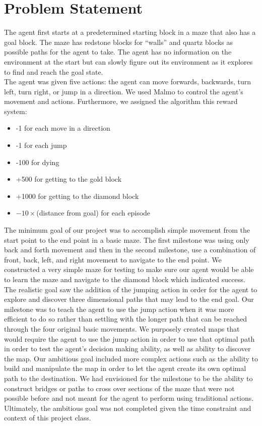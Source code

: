 \documentclass{article}
\begin{document}
\section{Problem Statement}

The agent first starts at a predetermined starting block in a maze that also has a goal block. The maze has redstone blocks for “walls” and quartz blocks as possible paths for the agent to take. The agent has no information on the environment at the start but can slowly figure out its environment as it explores to find and reach the goal state. \\
The agent was given five actions: the agent can move forwards, backwards, turn left, turn right, or jump in a direction. We used Malmo to control the agent’s movement and actions. Furthermore, we assigned the algorithm this reward system:

\begin{itemize}
    \item -1 for each move in a direction
    \item -1 for each jump
    \item -100 for dying
    \item +500 for getting to the gold block
    \item +1000 for getting to the diamond block
    \item $-10  \times $(distance from goal) for each episode
\end{itemize}
The minimum goal of our project was to accomplish simple movement from the start point to the end point in a basic maze. The first milestone was using only back and forth movement and then in the second milestone, use a combination of front, back, left, and right movement to navigate to the end point. We constructed a very simple maze for testing to make sure our agent would be able to learn the maze and navigate to the diamond block which indicated success. The realistic goal saw the addition of the jumping action in order for the agent to explore and discover three dimensional paths that may lead to the end goal. Our milestone was to teach the agent to use the jump action when it was more efficient to do so rather than settling with the longer path that can be reached through the four original basic movements. We purposely created maps that would require the agent to use the jump action in order to use that optimal path in order to test the agent’s decision making ability, as well as ability to discover the map. Our ambitious goal included more complex actions such as the ability to build and manipulate the map in order to let the agent create its own optimal path to the destination. We had envisioned for the milestone to be the ability to construct bridges or paths to cross over sections of the maze that were not possible before and not meant for the agent to perform using traditional actions. Ultimately, the ambitious goal was not completed given the time constraint and context of this project class.
\end{document}

